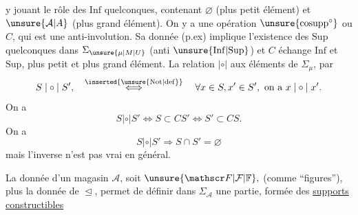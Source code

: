 
y jouant le rôle des $\mathrm{Inf}$ quelconques, contenant $\varnothing$ (plus petit élément) et $\unsure{\mathcal A|A}$ (plus grand élément). On y a une opération $\unsure{\mathrm{cosupp}^{\circ}}$ ou $C$, qui est une anti-involution. Sa donnée  (p.ex) implique l'existence des $\mathrm{Sup}$ quelconques dans $\Sigma_{\unsure{\mu|M|U}}$ (anti $\unsure{\mathrm{Inf}|\mathrm{Sup}}$) et $C$ échange $\mathrm{Inf}$ et $\mathrm{Sup}$, plus petit et plus grand élément. La relation $\mathrel{|\circ|}$   aux éléments de $\Sigma_\mu$, par
\[
S\mathrel{|\circ|}S',\quad \overset{\inserted{\unsure{\mathrm{Not}|\mathrm{def}}}}{\Longleftrightarrow}\quad \forall x\in S,x'\in S',\ \text{on a }x\mathrel{|\circ|}x'.
\]
On a
\[
S\mathrel{|\circ|}S'\Longleftrightarrow S\subset CS'\Longleftrightarrow S'\subset CS.
\]
On a
\[
S\mathrel{|\circ|}S'\Longrightarrow S\cap S'=\varnothing
\]
mais l'inverse n'est pas vrai en général.


La donnée d'un magasin  $\mathcal A$, soit $\unsure{\mathscr F|\mathcal F|\mathbb F},$ (comme ``figures''),  plus la donnée de $\trianglelefteq$, permet de définir dans $\Sigma_{\mathcal A}$ une partie, formée des \uline{supports constructibles}
